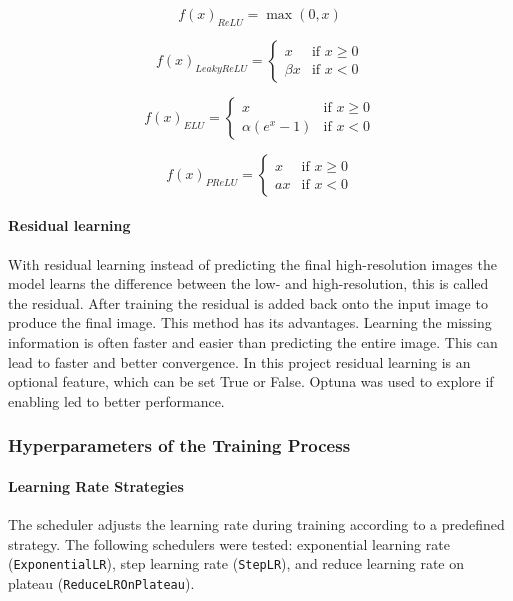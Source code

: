 \documentclass[twocolumn]{article}
\begin{document}
\begin{equation}\label{eq:4}
    f(x)_{ReLU} = \max(0, x)
\end{equation}

\begin{equation}\label{eq:5}
f(x)_{LeakyReLU} = 
\begin{cases}
x & \text{if } x \geq 0 \\
\beta x & \text{if } x < 0
\end{cases}
\end{equation}

\begin{equation}\label{eq:6}
f(x)_{ELU} = 
\begin{cases}
x & \text{if } x \geq 0 \\
\alpha (e^x - 1) & \text{if } x < 0
\end{cases}
\end{equation}


\begin{equation}\label{eq:7}
f(x)_{PReLU} = 
\begin{cases}
x & \text{if } x \geq 0 \\
a x & \text{if } x < 0
\end{cases}
\end{equation}

\paragraph{Residual learning}
With residual learning instead of predicting the final high-resolution images the model learns the difference between the low- and high-resolution, this is called the residual. 
After training the residual is added back onto the input image to produce the final image. This method has its advantages. 
Learning the missing information is often faster and easier than predicting the entire image. This can lead to faster and better convergence. 
In this project residual learning is an optional feature, which can be set True or False. Optuna was used to explore if enabling led to better performance.

\subsubsection{Hyperparameters of the Training Process}

\paragraph{Learning Rate Strategies} \label{subsec:LearningRateStrategies}
The scheduler adjusts the learning rate during training according to a predefined strategy.  
The following schedulers were tested: exponential learning rate (\texttt{ExponentialLR}), step learning rate (\texttt{StepLR}), and reduce learning rate on plateau (\texttt{ReduceLROnPlateau}).
\end{document}
